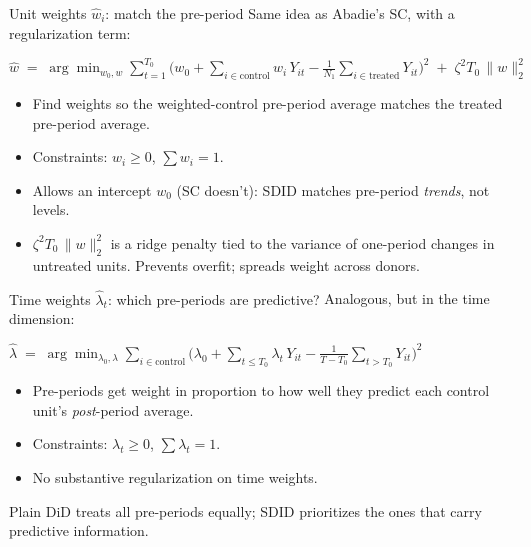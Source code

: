 \documentclass[aspectratio=169,11pt]{beamer}
\begin{document}
\begin{frame}{Unit weights $\widehat{w}_i$: match the pre-period}
\vspace{0.5em}
Same idea as Abadie's SC, with a regularization term:
\vspace{0.2em}
\begin{center}\small
$\widehat{w} \;=\; \displaystyle\arg\min_{w_0, w} \sum_{t=1}^{T_0}\big(w_0 + \textstyle\sum_{i \in \text{control}} w_i\, Y_{it} - \frac{1}{N_1}\sum_{i \in \text{treated}} Y_{it}\big)^2 \;+\; \zeta^2 T_0\, \|w\|_2^2$
\end{center}

\vspace{0.7em}
\begin{itemize}\small
  \item Find weights so the weighted-control pre-period average matches the treated pre-period average.
  \item Constraints: $w_i \geq 0$, $\sum w_i = 1$.
  \item Allows an intercept $w_0$ (SC doesn't): SDID matches pre-period \textit{trends}, not levels.
  \item $\zeta^2 T_0\,\|w\|_2^2$ is a ridge penalty tied to the variance of one-period changes in untreated units. \;Prevents overfit; spreads weight across donors.
\end{itemize}
\end{frame}

\begin{frame}{Time weights $\widehat{\lambda}_t$: which pre-periods are predictive?}
\vspace{0.5em}
Analogous, but in the time dimension:
\vspace{0.2em}
\begin{center}\small
$\widehat{\lambda} \;=\; \displaystyle\arg\min_{\lambda_0, \lambda} \sum_{i \in \text{control}}\big(\lambda_0 + \textstyle\sum_{t \leq T_0}\lambda_t\, Y_{it} - \frac{1}{T - T_0}\sum_{t > T_0} Y_{it}\big)^2$
\end{center}

\vspace{0.7em}
\begin{itemize}\small
  \item Pre-periods get weight in proportion to how well they predict each control unit's \textit{post}-period average.
  \item Constraints: $\lambda_t \geq 0$, $\sum \lambda_t = 1$.
  \item No substantive regularization on time weights. \;
\end{itemize}

\vspace{0.7em}
 \;Plain DiD treats all pre-periods equally; SDID prioritizes the ones that carry predictive information.
\end{frame}
\end{document}
